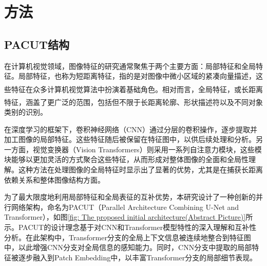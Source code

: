 \documentclass[a4paper]{ctexart}
\newcommand{\upcite}[1]{\rmfamily\textsuperscript{\textsuperscript{\cite{#1}}}}
\begin{document}
\section{方法}
	
\subsection{PACUT结构}
	
在计算机视觉领域，图像特征的研究通常聚焦于两个主要方面：局部特征和全局特征。局部特征，也称为短距离特征，指的是对图像中微小区域的紧凑向量描述，这些特征在众多计算机视觉算法中扮演着基础角色\upcite{jain1991unsupervised, lowe2004distinctive, ojala2002multiresolution}。相对而言，全局特征，或长距离特征，涵盖了更广泛的范围，包括但不限于长距离轮廓\upcite{lisin2005combining}、形状描述符以及不同对象类别的识别。

在深度学习的框架下，卷积神经网络（CNN）通过分层的卷积操作，逐步提取并加工图像的局部特征。这些特征随后被保留在特征图中，以供后续处理和分析。另一方面，视觉变换器（Vision Transformers）则采用一系列自注意力模块，这些模块能够以更加灵活的方式聚合这些特征，从而形成对整体图像的全面和全局性理解。这种方法在处理图像的全局特征时显示出了显著的优势，尤其是在捕获长距离依赖关系和整体图像结构方面。

为了最大限度地利用局部特征和全局表征的互补优势，本研究设计了一种创新的并行网络架构，命名为PACUT（Parallel Architecture Combining U-Net and Transformer），如图\ref{fig: The proposed initial architecture(Abstract Picture)}所示。PACUT的设计理念基于对CNN和Transformer模型特性的深入理解和互补性分析。在此架构中，Transformer分支的全局上下文信息被连续地整合到特征图中，以此增强CNN分支对全局信息的感知能力。同时，CNN分支中提取的局部特征被逐步融入到Patch Embedding中，以丰富Transformer分支的局部细节表现。
\end{document}

